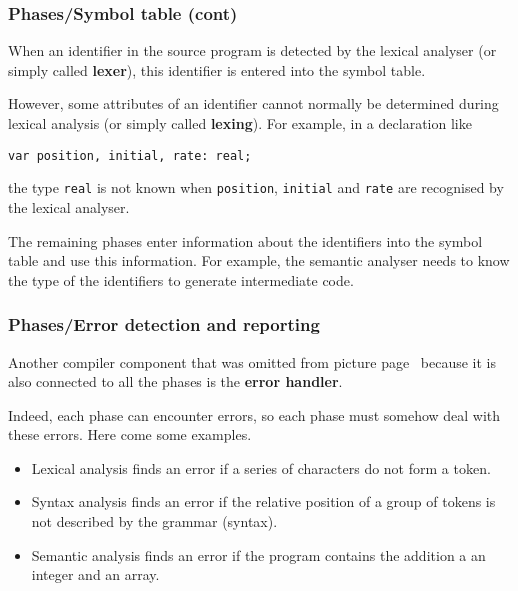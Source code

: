 % 
\begin{frame}[containsverbatim]
\frametitle{Phases/Symbol table (cont)}

When an identifier in the source program is detected by the lexical
analyser (or simply called \textbf{lexer}), this identifier is entered
into the symbol table.

\bigskip

However, some attributes of an identifier cannot normally be
determined during lexical analysis (or simply called
\textbf{lexing}). For example, in a \Pascal declaration like {\small
\begin{verbatim}
var position, initial, rate: real;
\end{verbatim}
}
the type \texttt{real} is not known when \texttt{position},
\texttt{initial} and \texttt{rate} are recognised by the lexical
analyser.

\bigskip

The remaining phases enter information about the identifiers into the
symbol table and use this information. For example, the semantic
analyser needs to know the type of the identifiers to generate
intermediate code.

\end{frame}

% 
\begin{frame}
\frametitle{Phases/Error detection and reporting}

Another compiler component that was omitted from picture
page~\pageref{phases} because it is also connected to all the phases
is the \textbf{error handler}.

\bigskip

Indeed, each phase can encounter errors, so each phase must somehow
deal with these errors. Here come some examples.
\begin{itemize}

  \item Lexical analysis finds an error if a series of characters do
  not form a token.

  \item Syntax analysis finds an error if the relative position of a
  group of tokens is not described by the grammar (syntax).

  \item Semantic analysis finds an error if the program contains
  the addition a an integer and an array.

\end{itemize}

\end{frame}

